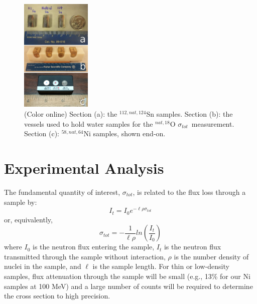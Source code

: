 \documentclass[twocolumn,secnumarabic,amssymb, nobibnotes, aps, prl,
superscriptaddress, nobalancelastpage]{revtex4}
\newcommand{\tot}{\ensuremath{\sigma_{tot}}}
\begin{document}
\begin{figure}
    \includegraphics[width=0.3\textwidth]{figures/AllIsotopicSamples.jpg}
    \caption{(Color online) Section (a): the ${^{112,nat,124}}$Sn samples. Section (b): the 
        vessels used to hold water samples for the ${^{nat, 18}}$O \tot\  measurement. 
        Section (c): ${^{58,nat,64}}$Ni samples, shown end-on.}
    \label{SamplesImage}
\end{figure}

\section{Experimental Analysis}

The fundamental quantity of interest, \tot, is related to the flux
loss through a sample by:
\begin{equation}
I_{t} = I_{0}e^{-{\ell\rho\sigma_{tot}}}
\end{equation}
or, equivalently,
\begin{equation}
    \tot = -\frac{1}{\ell\rho}ln\left(\frac{I_{t}}{I_{0}}\right)
\end{equation}
where $I_{0}$ is the neutron flux entering the sample, $I_{t}$ is the neutron
flux transmitted through the sample without interaction, $\rho$ is the number
density of nuclei in the sample, and $\ell$ is the sample length. For thin
or low-density samples, flux attenuation through the sample will be small
(e.g., 13\% for our Ni samples at 100 MeV) and a large number
of counts will be required to determine the cross section to high
precision.
\end{document}
